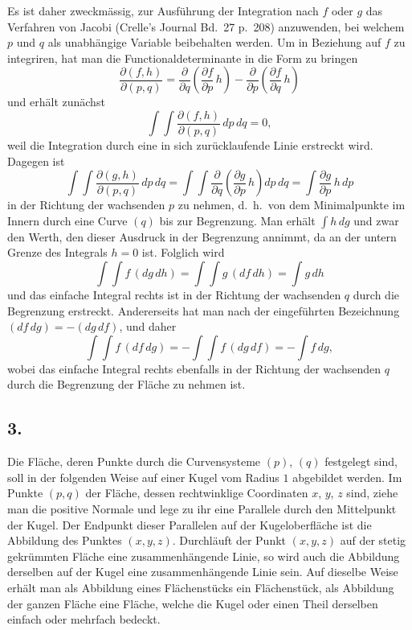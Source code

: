 \documentclass[12pt,a4paper]{article}
\begin{document}
Es ist daher zweckm\"assig, zur Ausf\"uhrung der Integration nach $f$ oder $g$ das Verfahren von Jacobi (Crelle's Journal Bd.~27 p.~208) anzuwenden, bei welchem $p$ und $q$ als unabh\"angige Variable beibehalten werden. Um in Beziehung auf $f$ zu integriren, hat man die Functionaldeterminante in die Form zu bringen
\[\frac{\partial(f,h)}{\partial(p,q)} = \frac{\partial}{\partial q} \left(\frac{\partial f}{\partial p}\, h\right) - \frac{\partial}{\partial p} \left(\frac{\partial f}{\partial q}\, h\right)\]
und erh\"alt zun\"achst
\[\int\!\int \frac{\partial(f,h)}{\partial(p,q)}\, dp\, dq = 0,\]
weil die Integration durch eine in sich zur\"ucklaufende Linie erstreckt wird. Dagegen ist
\[\int\!\int \frac{\partial(g,h)}{\partial(p,q)}\, dp\, dq = \int\!\int \frac{\partial}{\partial q} \left(\frac{\partial g}{\partial p}\, h\right) dp\, dq = \int \frac{\partial g}{\partial p}\, h\, dp\]
in der Richtung der wachsenden $p$ zu nehmen, d.\ h.\ von dem Minimalpunkte im Innern durch eine Curve $(q)$ bis zur Begrenzung. Man erh\"alt $\int h\, dg$ und zwar den Werth, den dieser Ausdruck in der Begrenzung annimmt, da an der untern Grenze des Integrals $h=0$ ist. Folglich wird
\[\int\!\int f \,(dg\, dh) = \int\!\int g \,(df\, dh) = \int g\, dh\]
und das einfache Integral rechts ist in der Richtung der wachsenden $q$ durch die Begrenzung erstreckt. Andererseits hat man nach der eingef\"uhrten Bezeichnung $(df\, dg) = -(dg\, df)$, und daher
\[\int\!\int f \,(df\, dg) = -\int\!\int f \,(dg\, df) = -\int f\, dg,\]
wobei das einfache Integral rechts ebenfalls in der Richtung der wachsenden $q$ durch die Begrenzung der Fl\"ache zu nehmen ist.

\subsection*{3.}

Die Fl\"ache, deren Punkte durch die Curvensysteme $(p)$, $(q)$ festgelegt sind, soll in der folgenden Weise auf einer Kugel vom Radius $1$ abgebildet werden. Im Punkte $(p,q)$ der Fl\"ache, dessen rechtwinklige Coordinaten $x$, $y$, $z$ sind, ziehe man die positive Normale und lege zu ihr eine Parallele durch den Mittelpunkt der Kugel. Der Endpunkt dieser Parallelen auf der Kugeloberfl\"ache ist die Abbildung des Punktes $(x,y,z)$. Durchl\"auft der Punkt $(x,y,z)$ auf der stetig gekr\"ummten Fl\"ache eine zusammenh\"angende Linie, so wird auch die Abbildung derselben auf der Kugel eine zusammenh\"angende Linie sein. Auf dieselbe Weise erh\"alt man als Abbildung eines Fl\"achenst\"ucks ein Fl\"achenst\"uck, als Abbildung der ganzen Fl\"ache eine Fl\"ache, welche die Kugel oder einen Theil derselben einfach oder mehrfach bedeckt.
\end{document}
